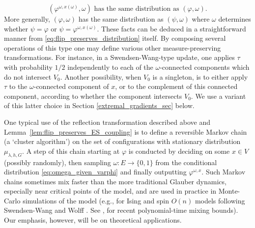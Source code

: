 \documentclass[english]{article}
\theoremstyle{plain}
\theoremstyle{plain}
\begin{document}
\begin{equation*}
  (\varphi^{\omega, x(\omega)}, \omega)\text{ has the same distribution as } (\varphi, \omega).
\end{equation*}
More generally, $(\varphi, \omega)$ has the same distribution as $(\psi, \omega)$ where $\omega$ determines whether $\psi=\varphi$ or $\psi=\varphi^{\omega,x(\omega)}$. These facts can be deduced in a straightforward manner from \eqref{eq:flip_preserves_distribution} itself. By composing several operations of this type one may define various other measure-preserving transformations. For instance, in a Swendsen-Wang-type update, one applies $\tau$ with
probability $1/2$ independently to each of the $\omega$-connected
components which do not intersect $V_0$. Another possibility, when
$V_0$ is a singleton, is to either apply $\tau$ to the
$\omega$-connected component of $x$, or to the complement of this
connected component, according to whether the component intersects
$V_0$. We use a variant of this latter choice in Section \ref{extremal_gradients_sec} below.

One typical use of the reflection transformation described above and
Lemma~\ref{lem:flip_preserves_ES_coupling} is to define a reversible
Markov chain (a `cluster algorithm') on the set of configurations
with stationary distribution $\mu_{\lambda, h, G}$. A step of this
chain starting at $\varphi$ is conducted by deciding on some $x\in
V$ (possibly randomly), then sampling $\omega:E\to\{0,1\}$ from the
conditional distribution \eqref{eq:omega_given_varphi} and finally
outputting $\varphi^{\omega, x}$. Such Markov chains sometimes mix
faster than the more traditional Glauber dynamics, especially near
critical points of the model, and are used in practice in
Monte-Carlo simulations of the model (e.g., for Ising and spin
$O(n)$ models following Swendsen-Wang
\cite{swendsen1987nonuniversal} and Wolff
\cite{wolff1989collective}. See \cite{ullrich2014swendsen},
\cite{guo2017random} for recent polynomial-time mixing bounds). Our
emphasis, however, will be on theoretical applications.
\end{document}
